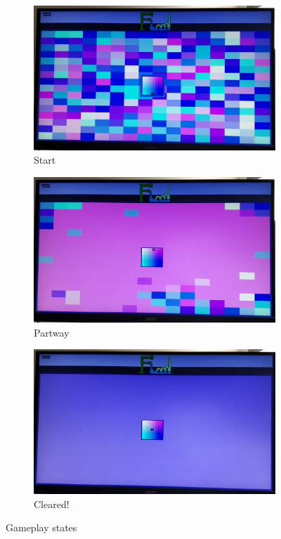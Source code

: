\begin{figure}[ht]
    \centering
    \begin{subfigure}[t]{0.3\linewidth}
        \includegraphics[width=\linewidth]{figures/start-1.jpg}
        \caption{Start}
    \end{subfigure}
    \hfill    
    \begin{subfigure}[t]{0.3\linewidth}
        \includegraphics[width=\linewidth]{figures/partway-1.jpg}
        \caption{Partway}
    \end{subfigure}
    \hfill    
    \begin{subfigure}[t]{0.3\linewidth}
        \includegraphics[width=\linewidth]{figures/complete-1.jpg}
        \caption{Cleared!}
    \end{subfigure}
    \caption{Gameplay states}
\end{figure}
